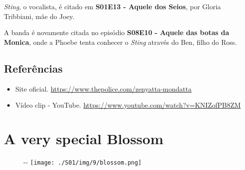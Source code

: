 \emph{Sting}, o vocalista, é citado em
\textbf{\textcolor{primarycolor}{S01E13 - Aquele dos Seios}}, por Gloria
Tribbiani, mãe do Joey.

A banda é novamente citada no episódio
\textbf{\textcolor{primarycolor}{S08E10 - Aquele das botas da Monica}},
onde a Phoebe tenta conhecer o \emph{Sting} através do Ben, filho do
Ross.

\hypertarget{referuxeancias-2}{%
\subsection{Referências}\label{referuxeancias-2}}

\begin{itemize}
\tightlist
\item
  \sloppy Site oficial. \url{https://www.thepolice.com/zenyatta-mondatta}
\item
  \sloppy Vídeo clip - YouTube. \url{https://www.youtube.com/watch?v=KNIZofPB8ZM}
\end{itemize}

\hypertarget{a-very-special-blossom}{%
\section{A very special Blossom}\label{a-very-special-blossom}}

\begin{figure}[!ht]
  \begin{adjustwidth}{-\oddsidemargin-1in}{-\rightmargin}
    \centering
    \texttt{[image: ./S01/img/9/blossom.png]}
  \end{adjustwidth}
\end{figure}

